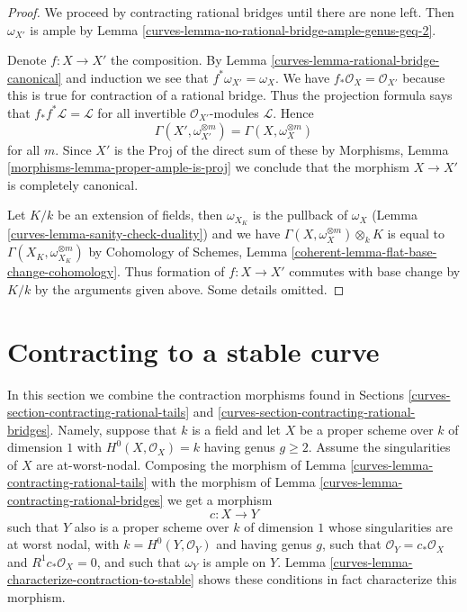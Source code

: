 \begin{proof}

We proceed by contracting rational bridges until there are none
left. Then $\omega_{X'}$ is ample by
Lemma \ref{curves-lemma-no-rational-bridge-ample-genus-geq-2}.

\medskip\noindent
Denote $f : X \to X'$ the composition. By
Lemma \ref{curves-lemma-rational-bridge-canonical} and induction we see that
$f^*\omega_{X'} = \omega_X$.
We have $f_*\mathcal{O}_X = \mathcal{O}_{X'}$
because this is true for contraction of a rational bridge.
Thus the projection formula says that
$f_*f^*\mathcal{L} = \mathcal{L}$ for all invertible
$\mathcal{O}_{X'}$-modules $\mathcal{L}$.
Hence
$$
\Gamma(X', \omega_{X'}^{\otimes m}) = \Gamma(X, \omega_X^{\otimes m})
$$
for all $m$. Since $X'$ is the Proj of the direct sum of these
by Morphisms, Lemma \ref{morphisms-lemma-proper-ample-is-proj}
we conclude that the morphism $X \to X'$ is completely canonical.

\medskip\noindent
Let $K/k$ be an extension of fields, then
$\omega_{X_K}$ is the pullback of $\omega_X$
(Lemma \ref{curves-lemma-sanity-check-duality}) and we have
$\Gamma(X, \omega_X^{\otimes m}) \otimes_k K$
is equal to
$\Gamma(X_K, \omega_{X_K}^{\otimes m})$
by
Cohomology of Schemes, Lemma \ref{coherent-lemma-flat-base-change-cohomology}.
Thus formation of $f : X \to X'$ commutes with base change by
$K/k$ by the arguments given above. Some details omitted.
\end{proof}

\section{Contracting to a stable curve}
\label{curves-section-contracting-to-stable}
In this section we combine the contraction morphisms found in
Sections \ref{curves-section-contracting-rational-tails} and
\ref{curves-section-contracting-rational-bridges}.
Namely, suppose that $k$ is a field and let $X$ be a proper scheme over $k$
of dimension $1$ with $H^0(X, \mathcal{O}_X) = k$ having genus $g \geq 2$.
Assume the singularities of $X$ are at-worst-nodal. Composing
the morphism of Lemma \ref{curves-lemma-contracting-rational-tails}
with the morphism of Lemma \ref{curves-lemma-contracting-rational-bridges}
we get a morphism
$$
c : X \longrightarrow Y
$$
such that $Y$ also is a proper scheme over $k$ of dimension $1$
whose singularities are at worst nodal, with $k = H^0(Y, \mathcal{O}_Y)$
and having genus $g$, such that
$\mathcal{O}_Y = c_*\mathcal{O}_X$ and $R^1c_*\mathcal{O}_X = 0$,
and such that $\omega_Y$ is ample on $Y$.
Lemma \ref{curves-lemma-characterize-contraction-to-stable}
shows these conditions in fact characterize
this morphism.

